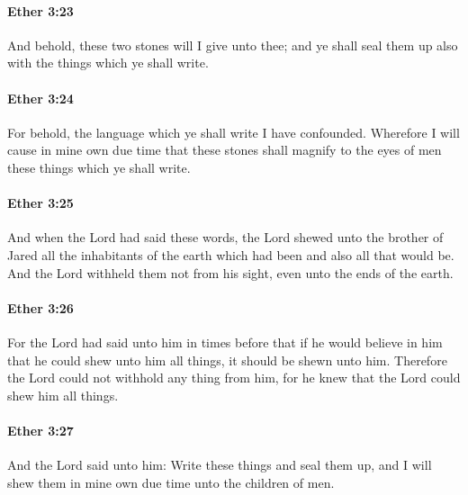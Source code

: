 		\paragraph{Ether 3:23} %
			\label{ETHER-3-23}

			And behold, these two stones will I give unto thee;
			and ye shall seal them up also with the things which ye shall write.

		\paragraph{Ether 3:24} %
			\label{ETHER-3-24}

			For behold, the language which ye shall write I have confounded.
			Wherefore I will cause in mine own due time
			that these stones shall magnify to the eyes of men
			these things which ye shall write.

		\paragraph{Ether 3:25} %
			\label{ETHER-3-25}

			And when the Lord had said these words,
			the Lord shewed unto the brother of Jared
			all the inhabitants of the earth which had been
			and also all that would be.
			And the Lord withheld them not from his sight,
			even unto the ends of the earth.

		\paragraph{Ether 3:26} %
			\label{ETHER-3-26}

			For the Lord had said unto him in times before
			that if he would believe in him that he could shew unto him all things,
			it should be shewn unto him.
			Therefore the Lord could not withhold any thing from him,
			for he knew that the Lord could shew him all things.

		\paragraph{Ether 3:27} %
			\label{ETHER-3-27}

			And the Lord said unto him:
			Write these things and seal them up,
			and I will shew them in mine own due time unto the children of men.

